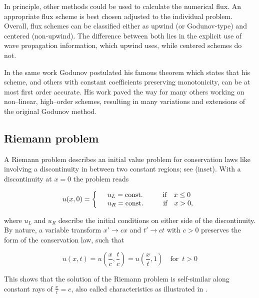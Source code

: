 In principle, other methods could be used to calculate the numerical flux.
An appropriate flux scheme is best chosen adjusted to the individual problem.
Overall, flux schemes can be classified either as upwind (or Godunov-type) and centered (non-upwind).
The difference between both lies in the explicit use of wave propagation information, which upwind uses, while centered schemes do not.

In the same work Godunov postulated his famous theorem which states that his scheme, and others with constant coefficients preserving monotonicity, can be at most first order accurate.
His work paved the way for many others working on non--linear, high--order schemes, resulting in many variations and extensions of the original Godunov method.


\subsection{Riemann problem}
\label{subsec:Riemann_problem}

A Riemann problem describes an initial value problem for conservation laws like  involving a discontinuity in between two constant regions; see  (inset).
With a discontinuity at $x = 0$ the problem reads

\begin{equation}
  u(x, 0) = \left\{\begin{array}{l l}
            &u_{L} = \text{const.} \hspace{1cm} \text{if} \quad x\leq0\\
            &u_{R} = \text{const.} \hspace{1cm} \text{if} \quad x>0,
            \end{array} \right.
\end{equation}

where $u_{L}$ and $u_{R}$ describe the initial conditions on either side of the discontinuity.
By nature, a variable transform $x' \to cx$ and $t' \to ct$ with $c>0$ preserves the form of the conservation law, such that

\begin{equation}
  u(x, t) = u(\frac{x}{c}, \frac{t}{c}) = u(\frac{x}{t}, 1) \quad \text{for }\,t>0
\end{equation}

This shows that the solution of the Riemann problem is self-similar along constant rays of $\frac{x}{t} = c$, also called characteristics as illustrated in .

